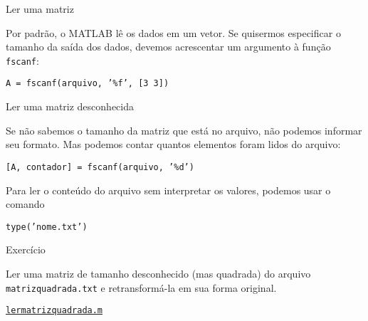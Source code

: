 \documentclass[hyperref={pdfpagelabels=false}]{beamer}
\begin{document}
\begin{frame}{Ler uma matriz}

  Por padrão, o MATLAB lê os dados em um vetor. Se quisermos especificar o tamanho da saída dos dados, devemos acrescentar um argumento à função \texttt{fscanf}:
  \begin{center}
    \texttt{A = fscanf(arquivo, '\%f', [3 3])}
  \end{center}

  \begin{center}
    \begin{minipage}{0.95\linewidth}
      
    \end{minipage}
  \end{center}
  
\end{frame}

\begin{frame}{Ler uma matriz desconhecida}

  Se não sabemos o tamanho da matriz que está no arquivo, não podemos informar seu formato. Mas podemos contar quantos elementos foram lidos do arquivo:

  \begin{center}
    \texttt{[A, contador] = fscanf(arquivo, '\%d')}
  \end{center}

  Para ler o conteúdo do arquivo sem interpretar os valores, podemos usar o comando
  \begin{center}
    \texttt{type('nome.txt')}
  \end{center}
  
\end{frame}

\begin{frame}{Exercício}

  Ler uma matriz de tamanho desconhecido (mas quadrada) do arquivo \texttt{\alert{matrizquadrada.txt}} e retransformá-la em sua forma original.

  \begin{center}
    \href{listing/lermatrizquadrada.m}{\underline{\texttt{lermatrizquadrada.m}}}
  \end{center}
  
\end{frame}
\end{document}
